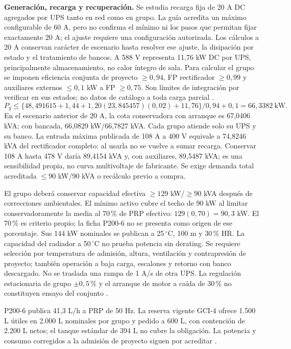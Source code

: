\textbf{Generación, recarga y recuperación.} Se estudia recarga fija de 20 A DC agregados por UPS tanto en red como en grupo. La guía acredita un máximo configurable de 60 A, pero no confirma el mínimo ni los pasos que permitan fijar exactamente 20 A; el ajuste requiere una configuración autorizada. Los cálculos a 20 A conservan carácter de escenario hasta resolver ese ajuste, la disipación por estado y el tratamiento de bancos. A 588 V representa 11,76 kW DC por UPS, principalmente almacenamiento, no calor íntegro de sala. Para calcular el grupo se imponen eficiencia conjunta de proyecto $\geq0,94$, FP rectificador $\geq0,99$ y auxiliares externos $\leq0,1$ kW a FP $\geq0,75$. Son límites de integración por verificar en sus estados; no datos de catálogo a toda carga parcial \parencite[pp.~3--4]{p7-eaton-93t-tecnica}.
\[
P_g\leq\{48,491615+1,44+1,20(23,845457)(0,02)+11,76\}/0,94+0,1
=66,3382\ \mathrm{kW}.
\]
En el escenario anterior de 20 A, la cota conservadora con arranque es 67,0406 kVA; con bancada, 66,0829 kW/66,7827 kVA. Cada grupo atiende solo su UPS y su banco. La entrada máxima publicada de 108 A a 400 V equivale a 74,8246 kVA del rectificador completo: al usarla no se vuelve a sumar recarga. Conservar 108 A hasta 478 V daría 89,4154 kVA y, con auxiliares, 89,5487 kVA; es una sensibilidad propia, no curva multivoltaje de fabricante. Se exige demanda total acreditada $\leq90$ kW/90 kVA o recálculo previo a compra.

El grupo deberá conservar capacidad efectiva $\geq129$ kW/$\geq90$ kVA después de correcciones ambientales. El mínimo activo cubre el techo de 90 kW al limitar conservadoramente la media al 70\,\% de PRP efectivo: $129(0,70)=90,3$ kW. El 70\,\% es criterio propio; la ficha P200-6 no se presenta como origen de ese porcentaje. Sus 144 kW nominales se publican a 25\,$^{\circ}$C, 100 m y 30\,\% HR. La capacidad del radiador a 50\,$^{\circ}$C no prueba potencia sin derating. Se requiere selección por temperatura de admisión, altura, ventilación y contrapresión de proyecto; también operación a baja carga, escalones y retorno con banco descargado. No se traslada una rampa de 1 A/s de otra UPS. La regulación estacionaria de grupo $\pm0,5\,\%$ y el arranque de motor a caída de 30\,\% no constituyen ensayo del conjunto \parencites[pp.~1/4--5]{p7-fg-p200-ficha}[p.~3]{p7-eaton-93t-tecnica}.

P200-6 publica 41,3 L/h a PRP de 50 Hz. La reserva vigente GCI-4 ofrece 1.500 L útiles en 2.000 L nominales por grupo y pedido a 600 L, con contención de 2.200 L netos; el tanque estándar de 394 L no cubre la obligación. La potencia y consumo corregidos a la admisión de proyecto siguen por acreditar \parencite{p7-fg-p200-ficha}.

